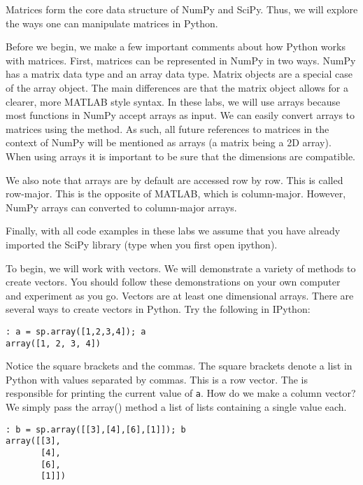 

Matrices form the core data structure of NumPy and SciPy.  Thus, we will explore
the ways one can manipulate matrices in Python.

Before we begin, we make a few important comments about how Python works with matrices. First, matrices can be represented in NumPy in two ways.  NumPy has a matrix
data type and an array data type.  Matrix objects are a special case of the array
object.  The main differences are that the matrix object allows for a clearer,
more MATLAB style syntax.  In these labs, we will use arrays because most functions in NumPy accept arrays as input. We can easily convert arrays to matrices using the 
method.  As such, all future references to matrices in the context of NumPy will be 
mentioned as arrays (a matrix being a 2D array).  When using arrays it is important to be sure that the dimensions are compatible.

We also note that arrays are by default are accessed row by row. This is called row-major. This is the opposite of MATLAB, which is column-major.  However, NumPy arrays can converted to column-major arrays.

Finally, with all code examples in these labs we assume that you have already imported the SciPy library (type  when you first open ipython).

To begin, we will work with vectors. We will demonstrate a variety of methods to
create vectors. You should follow these demonstrations on your own computer and
experiment as you go.  Vectors are at least one dimensional arrays.  There are
several ways to create vectors in Python.  Try the following in IPython:

\begin{lstlisting}
: a = sp.array([1,2,3,4]); a
array([1, 2, 3, 4])
\end{lstlisting}

Notice the square brackets and the commas.  The square brackets denote a list in
Python with values separated by commas.  This is a row vector.  The 
is responsible for printing the current value of \texttt{a}.  How do we make a
column vector?  We simply pass the array() method a list of lists containing a
single value each.
\begin{lstlisting}
: b = sp.array([[3],[4],[6],[1]]); b
array([[3],
       [4],
       [6],
       [1]])
\end{lstlisting}

